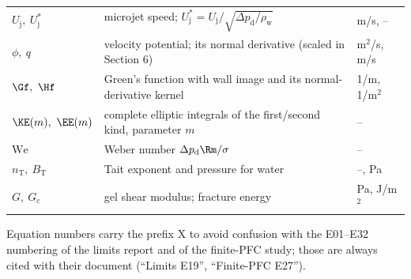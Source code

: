 \begin{center}
\begin{longtable}{>{\raggedright}p{}p{}p{}}
$U_{\mathrm j},\ U^*_{\mathrm j}$ & microjet speed; $U^*_{\mathrm j}=U_{\mathrm j}/\sqrt{\Delta p_{\mathrm d}/\rho_{\mathrm w}}$ & m/s, --\\
$\phi,\ q$ & velocity potential; its normal derivative (scaled in Section 6) & m$^2$/s, m/s\\
$\Gf,\ \Hf$ & Green's function with wall image and its normal-derivative kernel & 1/m, 1/m$^2$\\
$\KE(m),\ \EE(m)$ & complete elliptic integrals of the first/second kind, parameter $m$ & --\\
$\mathrm{We}$ & Weber number $\Delta p_{\mathrm d}\Rm/\sigma$ & --\\
$n_{\mathrm T},\ B_{\mathrm T}$ & Tait exponent and pressure for water & --, Pa\\
$G,\ G_{\mathrm c}$ & gel shear modulus; fracture energy & Pa, J/m$^2$\\
\bottomrule
\end{longtable}
\end{center}
Equation numbers carry the prefix X to avoid confusion with the E01--E32 numbering of the limits
report and of the finite-PFC study; those are always cited with their document
(``Limits E19'', ``Finite-PFC E27'').
